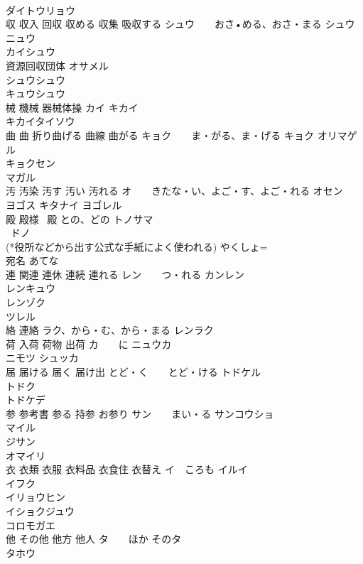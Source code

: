 \documentclass[8pt]{extreport}
\begin{document}
\begin{CJK}{UTF8}{min}
\\	ダイトウリョウ 
\\	収 収入 回収 収める 収集 吸収する	シュウ　　おさ•める、おさ・まる シュウニュウ
\\	カイシュウ
\\	資源回収団体 オサメル 
\\	シュウシュウ
\\	キュウシュウ
\\	械 機械 器械体操	カイ キカイ
\\	キカイタイソウ 
\\	曲 曲 折り曲げる 曲線 曲がる	キョク　　ま・がる、ま・げる キョク オリマゲル
\\	キョクセン
\\	マガル
\\	汚 汚染 汚す 汚い 汚れる	オ　　きたな・い、よご・す、よご・れる オセン
\\	ヨゴス キタナイ ヨゴレル
\\	殿 殿様 ~殿	との、どの トノサマ
\\	~ドノ
\\	(*役所などから出す公式な手紙によく使われる) やくしょ=
\\	宛名	あてな 
\\	連 関連 連休 連続 連れる	レン　　つ・れる カンレン
\\	レンキュウ
\\	レンゾク
\\	ツレル
\\	絡 連絡	ラク、から・む、から・まる レンラク
\\	荷 入荷 荷物 出荷	カ　　に ニュウカ
\\	ニモツ シュッカ
\\	届 届ける 届く 届け出	とど・く　　とど・ける トドケル
\\	トドク
\\	トドケデ
\\	参 参考書 参る 持参 お参り	サン　　まい・る サンコウショ
\\	マイル
\\	ジサン
\\	オマイリ
\\	衣 衣類 衣服 衣料品 衣食住 衣替え	イ　ころも イルイ
\\	イフク
\\	イリョウヒン 
\\	イショクジュウ　
\\	コロモガエ 
\\	他 その他 他方 他人	タ　　ほか そのタ
\\	タホウ

\end{CJK}
\end{document}
